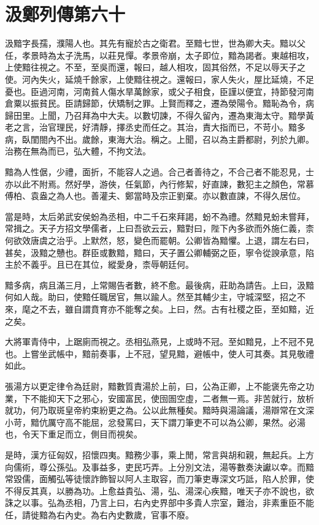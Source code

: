 \chapter{汲鄭列傳第六十}

汲黯字長孺，濮陽人也。其先有寵於古之衛君。至黯七世，世為卿大夫。黯以父任，孝景時為太子洗馬，以莊見憚。孝景帝崩，太子即位，黯為謁者。東越相攻，上使黯往視之。不至，至吳而還，報曰，越人相攻，固其俗然，不足以辱天子之使。河內失火，延燒千餘家，上使黯往視之。還報曰，家人失火，屋比延燒，不足憂也。臣過河南，河南貧人傷水旱萬餘家，或父子相食，臣謹以便宜，持節發河南倉粟以振貧民。臣請歸節，伏矯制之罪。上賢而釋之，遷為滎陽令。黯恥為令，病歸田里。上聞，乃召拜為中大夫。以數切諫，不得久留內，遷為東海太守。黯學黃老之言，治官理民，好清靜，擇丞史而任之。其治，責大指而已，不苛小。黯多病，臥閨閤內不出。歲餘，東海大治。稱之。上聞，召以為主爵都尉，列於九卿。治務在無為而已，弘大體，不拘文法。

黯為人性倨，少禮，面折，不能容人之過。合己者善待之，不合己者不能忍見，士亦以此不附焉。然好學，游俠，任氣節，內行修絜，好直諫，數犯主之顏色，常慕傅柏、袁盎之為人也。善灌夫、鄭當時及宗正劉棄。亦以數直諫，不得久居位。

當是時，太后弟武安侯蚡為丞相，中二千石來拜謁，蚡不為禮。然黯見蚡未嘗拜，常揖之。天子方招文學儒者，上曰吾欲云云，黯對曰，陛下內多欲而外施仁義，柰何欲效唐虞之治乎。上默然，怒，變色而罷朝。公卿皆為黯懼。上退，謂左右曰，甚矣，汲黯之戇也。群臣或數黯，黯曰，天子置公卿輔弼之臣，寧令從諛承意，陷主於不義乎。且已在其位，縱愛身，柰辱朝廷何。

黯多病，病且滿三月，上常賜告者數，終不愈。最後病，莊助為請告。上曰，汲黯何如人哉。助曰，使黯任職居官，無以踰人。然至其輔少主，守城深堅，招之不來，麾之不去，雖自謂賁育亦不能奪之矣。上曰，然。古有社稷之臣，至如黯，近之矣。

大將軍青侍中，上踞廁而視之。丞相弘燕見，上或時不冠。至如黯見，上不冠不見也。上嘗坐武帳中，黯前奏事，上不冠，望見黯，避帳中，使人可其奏。其見敬禮如此。

張湯方以更定律令為廷尉，黯數質責湯於上前，曰，公為正卿，上不能褒先帝之功業，下不能抑天下之邪心，安國富民，使囹圄空虛，二者無一焉。非苦就行，放析就功，何乃取斑皇帝約束紛更之為。公以此無種矣。黯時與湯論議，湯辯常在文深小苛，黯伉厲守高不能屈，忿發罵曰，天下謂刀筆吏不可以為公卿，果然。必湯也，令天下重足而立，側目而視矣。

是時，漢方征匈奴，招懷四夷。黯務少事，乘上閒，常言與胡和親，無起兵。上方向儒術，尊公孫弘。及事益多，吏民巧弄。上分別文法，湯等數奏決讞以幸。而黯常毀儒，面觸弘等徒懷詐飾智以阿人主取容，而刀筆吏專深文巧詆，陷人於罪，使不得反其真，以勝為功。上愈益貴弘、湯，弘、湯深心疾黯，唯天子亦不說也，欲誅之以事。弘為丞相，乃言上曰，右內史界部中多貴人宗室，難治，非素重臣不能任，請徙黯為右內史。為右內史數歲，官事不廢。

